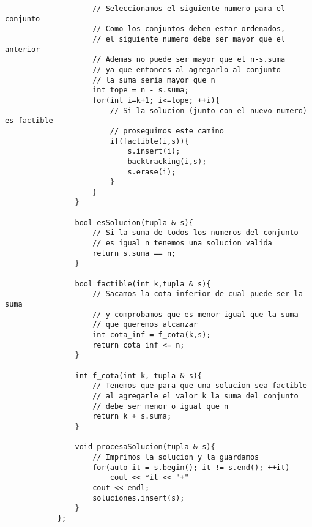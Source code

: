 \documentclass[12pt]{article}
\begin{document}
\begin{ejercicio}
\begin{lstlisting}
                    // Seleccionamos el siguiente numero para el conjunto
                    // Como los conjuntos deben estar ordenados,
                    // el siguiente numero debe ser mayor que el anterior
                    // Ademas no puede ser mayor que el n-s.suma
                    // ya que entonces al agregarlo al conjunto 
                    // la suma seria mayor que n
                    int tope = n - s.suma;
                    for(int i=k+1; i<=tope; ++i){
                        // Si la solucion (junto con el nuevo numero) es factible
                        // proseguimos este camino
                        if(factible(i,s)){
                            s.insert(i);
                            backtracking(i,s);
                            s.erase(i);
                        }
                    }
                }

                bool esSolucion(tupla & s){
                    // Si la suma de todos los numeros del conjunto 
                    // es igual n tenemos una solucion valida
                    return s.suma == n;
                }

                bool factible(int k,tupla & s){
                    // Sacamos la cota inferior de cual puede ser la suma 
                    // y comprobamos que es menor igual que la suma 
                    // que queremos alcanzar
                    int cota_inf = f_cota(k,s);
                    return cota_inf <= n;
                }

                int f_cota(int k, tupla & s){
                    // Tenemos que para que una solucion sea factible
                    // al agregarle el valor k la suma del conjunto 
                    // debe ser menor o igual que n
                    return k + s.suma;
                }

                void procesaSolucion(tupla & s){
                    // Imprimos la solucion y la guardamos
                    for(auto it = s.begin(); it != s.end(); ++it)
                        cout << *it << "+"
                    cout << endl;
                    soluciones.insert(s);
                }
            };
        \end{lstlisting} 

    \end{ejercicio}
    
\end{document}
